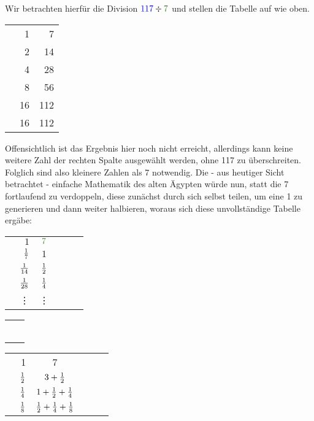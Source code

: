 	\begin{bsp}
		Wir betrachten hierfür die Division $\textcolor{blue}{117} \div \textcolor{OliveGreen}{7}$ und stellen die Tabelle auf wie oben.
		\begin{center}
			\begin{tabular}{r r r}
				& 1 & \textcolor{OliveGreen}{7}\\
				& 2 & 14\\
				& 4 & 28\\
				& 8 & 56\\
				\checkmark & 16 & 112\\ \hline
				\ding{53}& 16 & 112
			\end{tabular}
		\end{center}
		Offensichtlich ist das Ergebnis hier noch nicht erreicht, allerdings kann keine weitere Zahl der rechten Spalte ausgewählt werden, ohne 117 zu überschreiten. Folglich sind also kleinere Zahlen als 7 notwendig. Die - aus heutiger Sicht betrachtet - einfache Mathematik des alten Ägypten würde nun, statt die 7 fortlaufend zu verdoppeln, diese zunächst durch sich selbst teilen, um eine 1 zu generieren und dann weiter halbieren, woraus sich diese unvollständige Tabelle ergäbe:~\\
		\begin{table}[H]
			\centering
			\begin{tabular}{Sr Sr Sr}
				& $1$ & $\textcolor{OliveGreen}{7}$\\
				& $\frac{1}{7}$ & $1$\\
				& $\frac{1}{14}$ & $\frac{1}{2}$\\
				& $\frac{1}{28}$ & $\frac{1}{4}$\\
				& \vdots & \vdots \\
			\end{tabular}
			\qquad \quad
			\begin{tabular}{c | c}
					&\\&\\&\\&\\&\\&\\
			\end{tabular}
			\qquad
			\begin{tabular}[h]{Sr Sr Sr}
				& 1 & \textcolor{OliveGreen}{7}\\
				& $\frac{1}{2}$ & $3+\frac{1}{2}$\\
				& $\frac{1}{4}$ & $1+\frac{1}{2}+\frac{1}{4}$\\
				& $\frac{1}{8}$ & $\frac{1}{2}+\frac{1}{4}+\frac{1}{8}$\\

\end{tabular}
\end{table}
\end{bsp}
